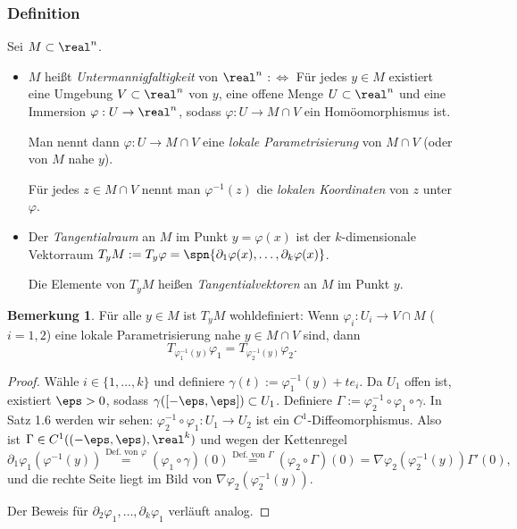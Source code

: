 \documentclass[
 a4paper,
 12pt,
 parskip=half
 ]{scrartcl}
\theoremstyle{plain}
\theoremstyle{definition}
\newtheorem*{rmrk}{Bemerkung}
\numberwithin{equation}{section}
\begin{document}
\subsubsection{Definition}
Sei $M \subset \real^n$.
\begin{itemize}
  \item $M$ heißt \emph{Untermannigfaltigkeit} von $\real^n$ $:\Leftrightarrow$ Für jedes $y \in M$ existiert eine Umgebung $V \subset \real^n$ von $y$, eine offene Menge $U \subset \real^n$ und eine Immersion $\varphi: U \to \real^n$, sodass $\varphi: U \to M \cap V$ ein Homöomorphismus ist.
  
  Man nennt dann $\varphi: U \to M \cap V$ eine \emph{lokale Parametrisierung} von $M \cap V$ (oder von $M$ nahe $y$). 
  
  Für jedes $z \in M \cap V$ nennt man $\varphi^{-1}(z)$ die \emph{lokalen Koordinaten} von $z$ unter $\varphi$.
  \item Der \emph{Tangentialraum} an $M$ im Punkt $y = \varphi(x)$ ist der $k$-dimensionale Vektorraum $T_y M := T_y \varphi = \spn \{ \partial_1 \varphi(x), \ldots, \partial_k \varphi(x) \}$. 
  
  Die Elemente von $T_y M$ heißen \emph{Tangentialvektoren} an $M$ im Punkt $y$.
\end{itemize}

\begin{rmrk}
 Für alle $y \in M$ ist $T_y M$ wohldefiniert: Wenn $\varphi_i: U_i \to V \cap M$ ($i = 1,2$) eine lokale Parametrisierung nahe $y \in M \cap V$ sind, dann
 \[ T_{\varphi^{-1}_1(y)} \varphi_1 = T_{\varphi^{-1}_2(y)} \varphi_2. \]
\end{rmrk}

\begin{proof}
 Wähle $i \in \{1, \ldots, k\}$ und definiere $\gamma(t) := \varphi_1^{-1}(y) + t e_i$.
 Da $U_1$ offen ist, existiert $\eps > 0$, sodass $\gamma( [-\eps, \eps] ) \subset U_1$. Definiere $\Gamma := \varphi_2^{-1} \circ \varphi_1 \circ \gamma$. In Satz 1.6 werden wir sehen: $\varphi_2^{-1} \circ \varphi_1: U_1 \to U_2$ ist ein $C^1$-Diffeomorphismus. Also ist $\Gamma \in C^1( (-\eps,\eps), \real^k)$ und wegen der Kettenregel
 \[ \partial_1 \varphi_1 ( \varphi^{-1} (y) ) \overset{\text{Def. von } \varphi}{=} (\varphi_1 \circ \gamma) (0) \overset{\text{Def. von } \Gamma}{=} (\varphi_2 \circ \Gamma) (0) = \nabla \varphi_2( \varphi_2^{-1}(y) ) \Gamma'(0), \]
 und die rechte Seite liegt im Bild von $\nabla \varphi_2( \varphi_2^{-1}(y) )$.
 
 Der Beweis für $\partial_2 \varphi_1, \ldots, \partial_k \varphi_1$ verläuft analog.
\end{proof}
\end{document}
